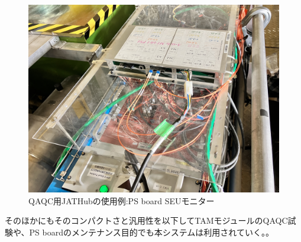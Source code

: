 \begin{figure} 
\centering
\includegraphics[width=16cm]{fig/QAQC/JATHubSEU.JPG}
\caption[QAQC用JATHubの使用例:PS board SEUモニター]{QAQC用JATHubの使用例:PS board SEUモニター\cite{mt_hashimoto}}
\label{JATHubSEU}
\end{figure}

そのほかにもそのコンパクトさと汎用性を以下してTAMモジュールのQAQC試験や、PS boardのメンテナンス目的でも本システムは利用されていく。。